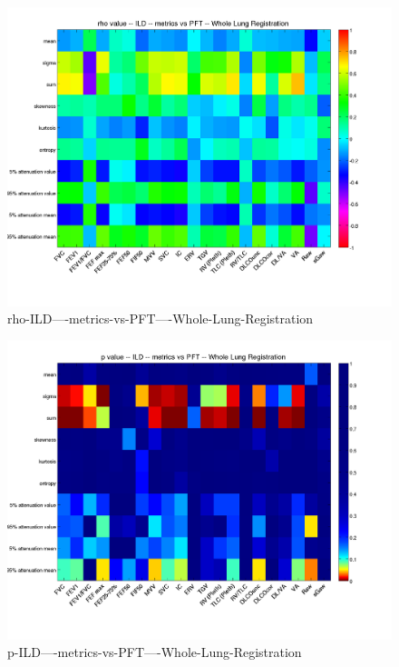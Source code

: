 \documentclass[12pt]{article}
\begin{document}
\begin{figure}
    \includegraphics[width=0.84\linewidth,viewport=100 60 620 550]{corr/rho-ILD----metrics-vs-PFT----Whole-Lung-Registration.png}
    \caption{rho-ILD----metrics-vs-PFT----Whole-Lung-Registration}
    \label{fig:rho-ILD----metrics-vs-PFT----Whole-Lung-Registration}
\end{figure}
\begin{figure}
    \includegraphics[width=0.84\linewidth,viewport=100 60 620 550]{corr/p-ILD----metrics-vs-PFT----Whole-Lung-Registration.png}
    \caption{p-ILD----metrics-vs-PFT----Whole-Lung-Registration}
    \label{fig:p-ILD----metrics-vs-PFT----Whole-Lung-Registration}
\end{figure}

\clearpage
\end{document}
